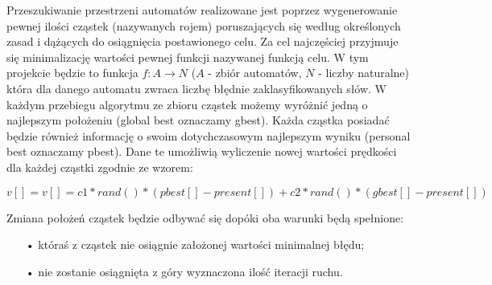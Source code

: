 \documentclass{llncs}
\begin{document}
Przeszukiwanie przestrzeni automatów realizowane jest poprzez wygenerowanie pewnej ilości cząstek (nazywanych rojem) poruszających się według określonych zasad i dążących do osiągnięcia postawionego celu. Za cel najczęściej przyjmuje się minimalizację wartości pewnej funkcji nazywanej funkcją celu. W tym projekcie będzie to funkcja $f:A \rightarrow N$ ($A$ - zbiór automatów, $N$ - liczby naturalne) która dla danego automatu zwraca liczbę błędnie zaklasyfikowanych słów. W każdym przebiegu algorytmu ze zbioru cząstek możemy wyróżnić jedną o najlepszym położeniu (global best oznaczamy gbest). Każda cząstka posiadać będzie również informację o swoim dotychczasowym najlepszym wyniku (personal best oznaczamy pbest). Dane te umożliwią wyliczenie nowej wartości prędkości dla każdej cząstki zgodnie ze wzorem: 

\begin{center}
$v[] = v[] = c1 * rand() * (pbest[] - present[]) + c2 * rand() * (gbest[] - present[])$
\end{center}

Zmiana położeń cząstek będzie odbywać się dopóki oba warunki będą spełnione:

\begin{itemize}
\item[•] któraś z cząstek nie osiągnie założonej wartości minimalnej błędu;
\item[•] nie zostanie osiągnięta z góry wyznaczona ilość iteracji ruchu.
\end{itemize}
\end{document}

